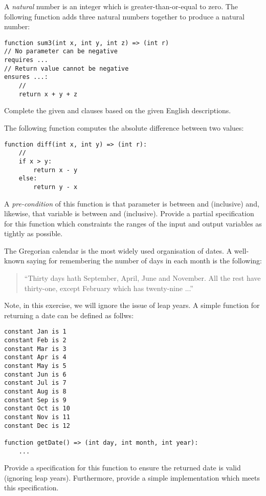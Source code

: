 \begin{ex}

A {\em natural} number is an integer which is greater-than-or-equal to
zero.  The following function adds three natural numbers together to produce a natural number:
\begin{lstlisting}
function sum3(int x, int y, int z) => (int r)
// No parameter can be negative
requires ...
// Return value cannot be negative
ensures ...:
    //
    return x + y + z
\end{lstlisting}
Complete the given  and 
clauses based on the given English descriptions.

\end{ex}

\begin{ex}
  The following function computes the absolute difference between two values:

\begin{lstlisting}
function diff(int x, int y) => (int r):
    //
    if x > y:
        return x - y
    else:
        return y - x
\end{lstlisting}

A {\em pre-condition} of this function is that parameter 
is between  and  (inclusive) and,
likewise, that variable  is between  and
 (inclusive).  Provide a partial specification for
this function which constraints the ranges of the input and output
variables as tightly as possible.
\end{ex}

\begin{ex}
The Gregorian calendar is the most widely used organisation of dates.
A well-known saying for remembering the number of days in each month
is the following:
\begin{quote}
``Thirty days hath September, April, June and November.  All the rest
have thirty-one, except February which has twenty-nine ...''
\end{quote}
Note, in this exercise, we will ignore the issue of leap years.  A
simple function for returning a date can be defined as follws:
\begin{lstlisting}
constant Jan is 1
constant Feb is 2
constant Mar is 3
constant Apr is 4
constant May is 5
constant Jun is 6
constant Jul is 7
constant Aug is 8
constant Sep is 9
constant Oct is 10
constant Nov is 11
constant Dec is 12

function getDate() => (int day, int month, int year):
    ...
\end{lstlisting}
Provide a specification for this function to ensure the returned date
is valid (ignoring leap years).  Furthermore, provide a simple
implementation which meets this specification.
\end{ex}

